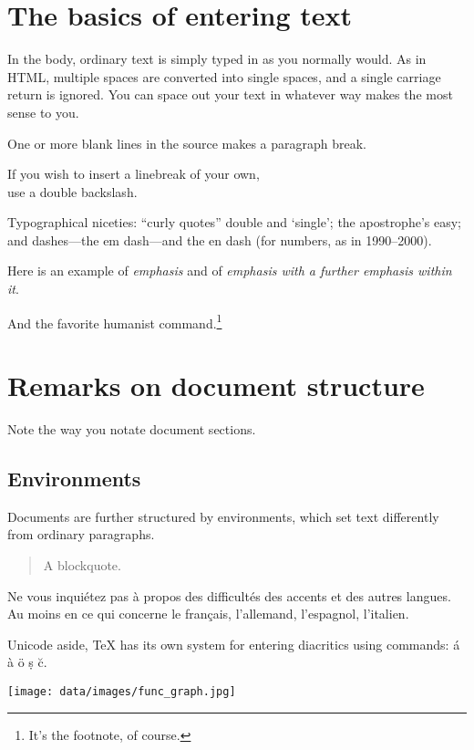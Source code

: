 \documentclass[12pt]{article}
\begin{document}
\section{The basics of entering text}

In the body, ordinary text is simply typed in as you normally would. As in HTML, multiple spaces are converted      into  single spaces, and
a single carriage return is
ignored. You can space out your text in whatever way makes the most sense to you.

One or more blank lines in the source makes a paragraph break.

If you wish to insert a linebreak of your own, \\ use a double backslash.

Typographical niceties: ``curly quotes'' double and `single'; the apostrophe's easy; and dashes---the em dash---and the en dash (for numbers, as in 1990--2000).

Here is an example of \emph{emphasis} and of \emph{emphasis with a \emph{further} emphasis within it}.

And the favorite humanist command.\footnote{It's the footnote, of course.}

\section{Remarks on document structure}

Note the way you notate document sections.

\subsection{Environments}

Documents are further structured by environments, which set text differently from ordinary paragraphs.
\begin{quote}
A blockquote.
\end{quote}
Ne vous inquiétez pas à propos des difficultés des accents et des autres langues. Au moins en ce qui concerne le français, l'allemand, l'espagnol, l'italien.

Unicode aside, TeX has its own system for entering diacritics using commands: \'a \`a \"o \d s \u c.

\texttt{[image: data/images/func\_graph.jpg]}


\end{document}
